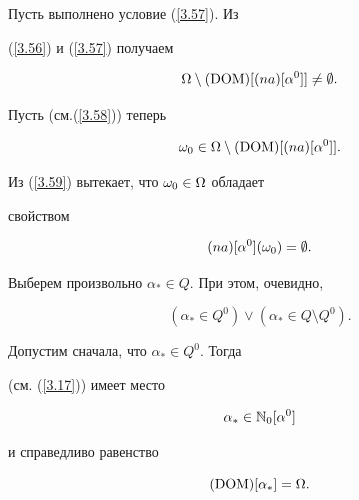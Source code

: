 \begin{pf}


Пусть выполнено условие (\ref{3.57}). Из


(\ref{3.56}) и (\ref{3.57}) получаем


\begin{equation}\label{3.58}


\Om \setminus (\DOM)[(na)[{\alpha}^0]] \ne \emp.


\end{equation}


Пусть (см.(\ref{3.58})) теперь


\begin{equation}\label{3.59}


{{\omega}_0} \in \Om \setminus (\DOM)[(na)[{\alpha}^0]].


\end{equation}


Из (\ref{3.59}) вытекает, что ${{\omega}_0} \in \Omega$ обладает


свойством


\begin{equation}\label{3.62}


(na)[{\alpha}^0]({{\omega}_0}) = \emp.


\end{equation}


Выберем произвольно ${{\alpha}_*} \in Q$. При этом, очевидно,


\begin{equation}\label{3.64}


({{\alpha}_*} \in {Q^0}) \vee ({{\alpha}_*} \in Q \setminus {Q^0}).


\end{equation}


Допустим сначала, что ${{\alpha}_*} \in {Q^0}$. Тогда


(см. (\ref{3.17})) имеет место


\begin{equation}\label{3.66}


{{\alpha}_*} \in {{\Bbb{N}}_0}[{\alpha}^0]


\end{equation}


и справедливо равенство


\begin{equation}\label{3.67}


(\DOM)[{\alpha}_*] = \Om.


\end{equation}



\end{pf}
